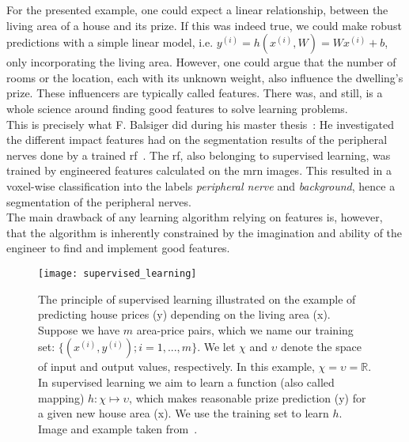 For the presented example, one could expect a linear relationship, between the living area of a house and its prize. If this was indeed true, we could make robust predictions with a simple linear model, i.e. $y^{(i)} = h(x^{(i)}, W) = Wx^{(i)} + b$, only incorporating the living area. However, one could argue that the number of rooms or the location, each with its unknown weight, also influence the dwelling's prize. These influencers are typically called features. There was, and still, is a whole science around finding good features to solve learning problems.\\
This is precisely what F. Balsiger did during his master thesis~\cite{Balsiger2016DevelopmentApproaches}: He investigated the different impact features had on the segmentation results of the peripheral nerves done by a trained \gls{rf}~\cite{Breiman2001RandomForests}. The \gls{rf}, also belonging to supervised learning, was trained by engineered features calculated on the \gls{mrn} images. This resulted in a voxel-wise classification into the labels \textit{peripheral nerve} and \textit{background}, hence a segmentation of the peripheral nerves. \\
The main drawback of any learning algorithm relying on features is, however, that the algorithm is inherently constrained by the imagination and ability of the engineer to find and implement good features.

\begin{figure}[htbp]
    \centering
	\texttt{[image: supervised\_learning]}
    \caption[Supervised Learning]{The principle of supervised learning illustrated on the example of predicting house prices (y) depending on the living area (x). Suppose we have $m$ area-price pairs, which we name our training set: $\{(x^{(i)}, y^{(i)}); i = 1,...,m\}$. We let $\chi$ and $\upsilon$ denote the space of input and output values, respectively. In this example, $\chi = \upsilon = \mathbb{R}$. In supervised learning we aim to learn a function (also called mapping) $h : \chi \mapsto \upsilon$, which makes reasonable prize prediction (y) for a given new house area (x). We use the training set to learn $h$. Image and example taken from~\cite{Ng2012StanfordNotes}.}
    \label{fig:dl_supervised}
\end{figure}

